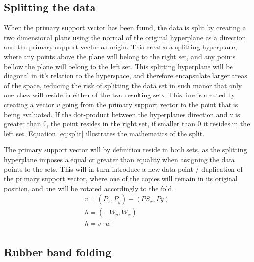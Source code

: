 \documentclass[a4paper,twoside]{bth}
\begin{document}
\subsection{Splitting the data}
When the primary support vector has been found, the data is split by creating a two dimensional plane using the normal of the original hyperplane as a direction and the primary support vector as origin. This creates a splitting hyperplane, where any points above the plane will belong to the right set, and any points bellow the plane will belong to the left set. This splitting hyperplane will be diagonal in it's relation to the hyperspace, and therefore encapsulate larger areas of the space, reducing the risk of splitting the data set in such manor that only one class will reside in either of the two resulting sets. This line is created by creating a vector $v$ going from the primary support vector to the point that is being evaluated. If the dot-product between the hyperplanes direction and v is greater than 0, the point resides in the right set, if smaller than 0 it resides in the left set. Equation \ref{eq:split} illustrates the mathematics of the split.
\par The primary support vector will by definition reside in both sets, as the splitting hyperplane imposes a equal or greater than equality when assigning the data points to the sets. This will in turn introduce a new data point / duplication of the primary support vector, where one of the copies will remain in its original position, and one will be rotated accordingly to the fold.
\begin{equation}\label{eq:split}
\begin{aligned}
    v = (P_x, P_y) - (PS_x, Py) \\
    h = (-W_y, W_x) \\
    h = v \cdot w \\
\end{aligned}
\end{equation} 



\subsection{Rubber band folding}
\end{document}
